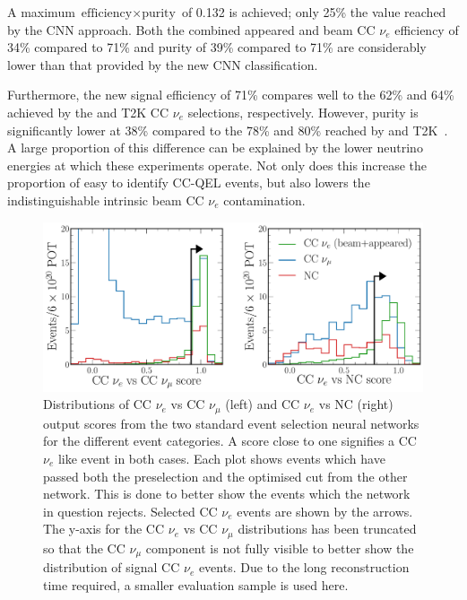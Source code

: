 A maximum $\text{efficiency}\times\text{purity}$ of 0.132 is achieved; only 25\% the value reached
by the CNN approach. Both the combined appeared and beam CC $\nu_{e}$ efficiency of 34\% compared
to 71\% and purity of 39\% compared to 71\% are considerably lower than that provided by the new
CNN classification.

Furthermore, the new signal efficiency of 71\% compares well to the 62\% and 64\% achieved by the
\nova and T2K CC $\nu_{e}$ selections, respectively. However, purity is significantly lower at
38\% compared to the 78\% and 80\% reached by \nova and T2K~\cite{acero2019, abe2015}. A large
proportion of this difference can be explained by the lower neutrino energies at which these
experiments operate. Not only does this increase the proportion of easy to identify CC-QEL events,
but also lowers the indistinguishable intrinsic beam CC $\nu_{e}$ contamination.

\begin{figure} %
    \includegraphics[width=\textwidth]{diagrams/7-results/final_old_pid_outputs.pdf}
    \caption[Distributions of standard event selection neural network output scores]
    {Distributions of CC $\nu_{e}$ vs CC $\nu_{\mu}$ (left) and CC $\nu_{e}$ vs NC (right) output
        scores from the two standard event selection neural networks for the different event
        categories. A score close to one signifies a CC $\nu_{e}$ like event in both cases. Each
        plot shows events which have passed both the preselection and the optimised cut from the
        other network. This is done to better show the events which the network in question
        rejects. Selected CC $\nu_{e}$ events are shown by the arrows. The y-axis for the CC
        $\nu_{e}$ vs CC $\nu_{\mu}$ distributions has been truncated so that the CC $\nu_{\mu}$
        component is not fully visible to better show the distribution of signal CC $\nu_{e}$
        events. Due to the long reconstruction time required, a smaller evaluation sample is used
        here.}
    \label{fig:final_old_pid_outputs}
\end{figure}

